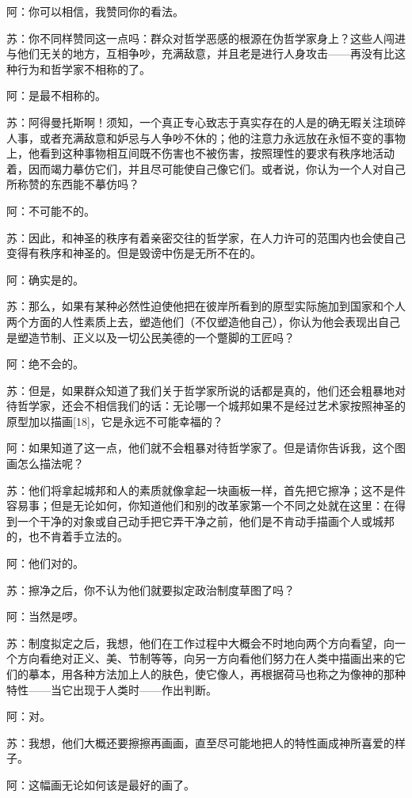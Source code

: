 \documentclass[12pt,oneside]{book}
\begin{document}
阿：你可以相信，我赞同你的看法。

苏：你不同样赞同这一点吗：群众对哲学恶感的根源在伪哲学家身上？这些人闯进与他们无关的地方，互相争吵，充满敌意，并且老是进行人身攻击——再没有比这种行为和哲学家不相称的了。

阿：是最不相称的。

苏：阿得曼托斯啊！须知，一个真正专心致志于真实存在的人是的确无暇关注琐碎人事，或者充满敌意和妒忌与人争吵不休的；他的注意力永远放在永恒不变的事物上，他看到这种事物相互间既不伤害也不被伤害，按照理性的要求有秩序地活动着，因而竭力摹仿它们，并且尽可能使自己像它们。或者说，你认为一个人对自己所称赞的东西能不摹仿吗？

阿：不可能不的。

苏：因此，和神圣的秩序有着亲密交往的哲学家，在人力许可的范围内也会使自己变得有秩序和神圣的。但是毁谤中伤是无所不在的。

阿：确实是的。

苏：那么，如果有某种必然性迫使他把在彼岸所看到的原型实际施加到国家和个人两个方面的人性素质上去，塑造他们（不仅塑造他自己），你认为他会表现出自己是塑造节制、正义以及一切公民美德的一个蹩脚的工匠吗？

阿：绝不会的。

苏：但是，如果群众知道了我们关于哲学家所说的话都是真的，他们还会粗暴地对待哲学家，还会不相信我们的话：无论哪一个城邦如果不是经过艺术家按照神圣的原型加以描画[18]，它是永远不可能幸福的？

阿：如果知道了这一点，他们就不会粗暴对待哲学家了。但是请你告诉我，这个图画怎么描法呢？

苏：他们将拿起城邦和人的素质就像拿起一块画板一样，首先把它擦净；这不是件容易事；但是无论如何，你知道他们和别的改革家第一个不同之处就在这里：在得到一个干净的对象或自己动手把它弄干净之前，他们是不肯动手描画个人或城邦的，也不肯着手立法的。

阿：他们对的。

苏：擦净之后，你不认为他们就要拟定政治制度草图了吗？

阿：当然是啰。

苏：制度拟定之后，我想，他们在工作过程中大概会不时地向两个方向看望，向一个方向看绝对正义、美、节制等等，向另一方向看他们努力在人类中描画出来的它们的摹本，用各种方法加上人的肤色，使它像人，再根据荷马也称之为像神的那种特性——当它出现于人类时——作出判断。

阿：对。

苏：我想，他们大概还要擦擦再画画，直至尽可能地把人的特性画成神所喜爱的样子。

阿：这幅画无论如何该是最好的画了。
\end{document}

